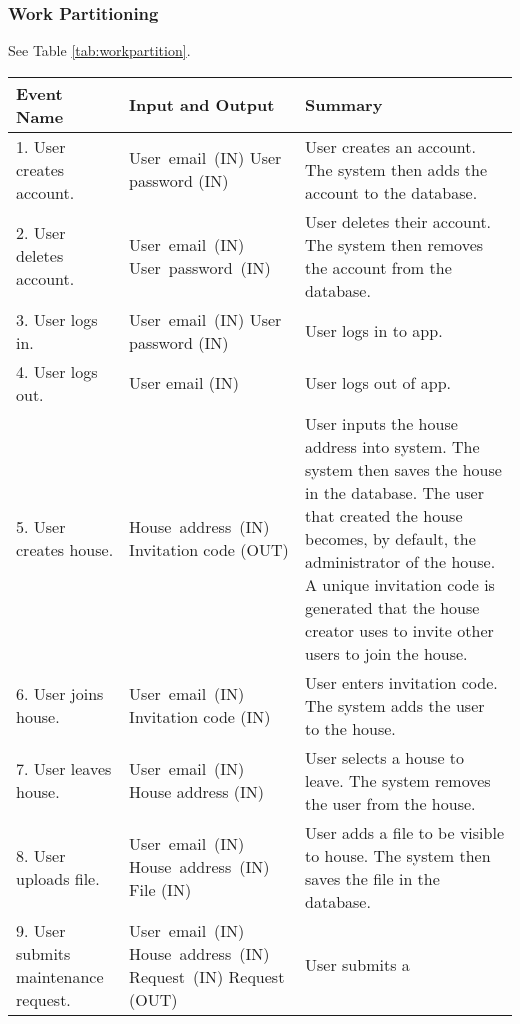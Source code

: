 \documentclass[12pt]{article}
\begin{document}
\subsubsection{Work Partitioning} 
See Table \ref{tab:workpartition}.
\begin{longtable}{|p{5cm}|p{5cm}|p{5cm}|}
\hline
\textbf{Event Name}  & \textbf{Input and Output} & \textbf{Summary} \\ 
\hline
1. User creates account. & \mbox{User email (IN)} \linebreak User password (IN) & User creates 
an account. The system then adds the account to the database. \\ 
\hline
2. User deletes account. & \mbox{User email (IN)} \linebreak \mbox{User password 
(IN)} & User deletes their account. The system then removes the account from the 
database. \\ 
\hline
3. User logs in. & \mbox{User email (IN)} \linebreak User password (IN) & User logs 
in to app. \\ 
\hline
4. User logs out. & User email (IN) & User logs out of app. \\
\hline
5. User creates house. & \mbox{House address (IN)} \linebreak Invitation code (OUT) & User 
inputs the house address into system. The system then saves the house in the 
database. The user that created the house becomes, by default, the administrator of the house. A unique invitation code is generated that the house creator uses to invite other users to join the house. \\
\hline
6. User joins house. & \mbox{User email (IN)} \linebreak Invitation code (IN) & User 
enters invitation code. The system adds the user to the house. \\
\hline
7. User leaves house. & \mbox{User email (IN)} \linebreak House address (IN) & User 
selects a house to leave. The system removes the user from the house. \\
\hline
8. User uploads file. & \mbox{User email (IN)} \linebreak \mbox{House address (IN)} \linebreak File (IN) & User adds a 
file to be visible to house. The system then saves the file in the database. \\
\hline
9. User submits maintenance request. & \mbox{User email (IN)} \linebreak \mbox{House address (IN)} \linebreak \mbox{Request (IN)} \linebreak Request (OUT) & User submits a 

\end{longtable}
\end{document}
